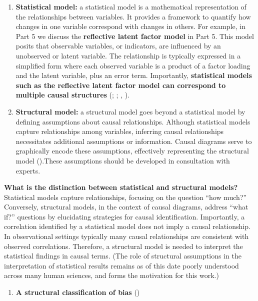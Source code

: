 \documentclass[
  singlecolumn]{article}
\providecommand{\tightlist}{%
  \setlength{\itemsep}{0pt}\setlength{\parskip}{0pt}}\usepackage{longtable,booktabs,array}
\begin{document}
\begin{enumerate}
\def\labelenumi{\arabic{enumi}.}
\setcounter{enumi}{16}
\item
  \textbf{Statistical model:} a statistical model is a mathematical
  representation of the relationships between variables. It provides a
  framework to quantify how changes in one variable correspond with
  changes in others. For example, in Part 5 we discuss the
  \textbf{reflective latent factor model} in Part 5. This model posits
  that observable variables, or indicators, are influenced by an
  unobserved or latent variable. The relationship is typically expressed
  in a simplified form where each observed variable is a product of a
  factor loading and the latent variable, plus an error term.
  Importantly, \textbf{statistical models such as the reflective latent
  factor model can correspond to multiple causal structures}
  (;
  ;
  ,
  ).
\item
  \textbf{Structural model:} a structural model goes beyond a
  statistical model by defining assumptions about causal relationships.
  Although statistical models capture relationships among variables,
  inferring causal relationships necessitates additional assumptions or
  information. Causal diagrams serve to graphically encode these
  assumptions, effectively representing the structural model
  ().These
  assumptions should be developed in consultation with experts.
\end{enumerate}

\textbf{What is the distinction between statistical and structural
models?} Statistical models capture relationships, focusing on the
question ``how much?'' Conversely, structural models, in the context of
causal diagrams, address ``what if?'' questions by elucidating
strategies for causal identification. Importantly, a correlation
identified by a statistical model does not imply a causal relationship.
In observational settings typically many causal relationships are
consistent with observed correlations. Therefore, a structural model is
needed to interpret the statistical findings in causal terms. (The role
of structural assumptions in the interpretation of statistical results
remains as of this date poorly understood across many human sciences,
and forms the motivation for this work.)

\begin{enumerate}
\def\labelenumi{\arabic{enumi}.}
\setcounter{enumi}{18}
\tightlist
\item
  \textbf{A structural classification of bias}
  ()
\end{enumerate}
\end{document}
